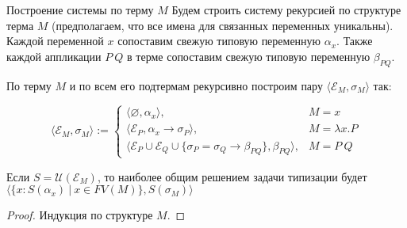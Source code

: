 \documentclass[aspectratio=169]{beamer}
\begin{document}
\begin{frame}{Построение системы по терму $M$}
Будем строить систему рекурсией по структуре терма $M$ (предполагаем, что все имена
для связанных переменных уникальны). 
Каждой переменной $x$ сопоставим свежую типовую переменную $\alpha_x$. Также каждой аппликации $P\ Q$ в терме сопоставим
свежую типовую переменную $\beta_{PQ}$. 


По терму $M$ и по всем его подтермам рекурсивно построим пару $\langle \mathcal{E}_M, \sigma_M\rangle$ так:


$$\langle\mathcal{E}_M,\sigma_M\rangle := \left\{\begin{array}{ll}\langle \varnothing, \alpha_x\rangle, & M = x\\
\langle \mathcal{E}_P, \alpha_x\rightarrow\sigma_P\rangle, & M = \lambda x.P\\
\langle \mathcal{E}_P\cup\mathcal{E}_Q\cup\{\sigma_P = \sigma_Q\rightarrow\beta_{PQ}\}, \beta_{PQ}\rangle, 
   & M = P\ Q
\end{array}\right.$$

\begin{thm} Если $S = \mathcal{U}(\mathcal{E}_M)$, то наиболее общим решением задачи типизации будет
$\langle\{ x : S(\alpha_x)\ |\ x \in FV(M) \}, S(\sigma_M)\rangle$\end{thm}
\begin{proof} Индукция по структуре $M$. \end{proof}
\end{frame}
\end{document}
